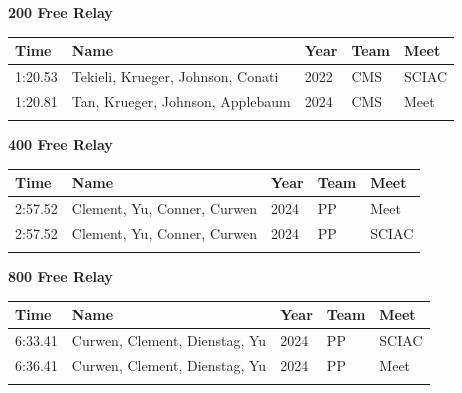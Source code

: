\vspace{1.2em}
\noindent\begin{minipage}[t]{0.98\textwidth}
\centering
\textbf{\textcolor{teamprimary}{200 Free Relay}}\par
\vspace{0.5em}
\centering
\small
\renewcommand{\arraystretch}{1.0}
\setlength{\tabcolsep}{4pt}
\begin{tabular}{@{}p{2.7cm}p{4.3cm}p{1.6cm}p{2.7cm}p{2.7cm}@{}}
\toprule
\textbf{Time} & \textbf{Name} & \textbf{Year} & \textbf{Team} & \textbf{Meet} \\
\midrule
1:20.53 & Tekieli, Krueger, Johnson, Conati & 2022 & CMS & SCIAC \\
1:20.81 & Tan, Krueger, Johnson, Applebaum & 2024 & CMS & Meet \\
\bottomrule
\vspace{0.5em}
\end{tabular}
\end{minipage}
\vspace{1.2em}
\noindent\begin{minipage}[t]{0.98\textwidth}
\centering
\textbf{\textcolor{teamprimary}{400 Free Relay}}\par
\vspace{0.5em}
\centering
\small
\renewcommand{\arraystretch}{1.0}
\setlength{\tabcolsep}{4pt}
\begin{tabular}{@{}p{2.7cm}p{4.3cm}p{1.6cm}p{2.7cm}p{2.7cm}@{}}
\toprule
\textbf{Time} & \textbf{Name} & \textbf{Year} & \textbf{Team} & \textbf{Meet} \\
\midrule
2:57.52 & Clement, Yu, Conner, Curwen & 2024 & PP & Meet \\
2:57.52 & Clement, Yu, Conner, Curwen & 2024 & PP & SCIAC \\
\bottomrule
\vspace{0.5em}
\end{tabular}
\end{minipage}
\vspace{1.2em}
\noindent\begin{minipage}[t]{0.98\textwidth}
\centering
\textbf{\textcolor{teamprimary}{800 Free Relay}}\par
\vspace{0.5em}
\centering
\small
\renewcommand{\arraystretch}{1.0}
\setlength{\tabcolsep}{4pt}
\begin{tabular}{@{}p{2.7cm}p{4.3cm}p{1.6cm}p{2.7cm}p{2.7cm}@{}}
\toprule
\textbf{Time} & \textbf{Name} & \textbf{Year} & \textbf{Team} & \textbf{Meet} \\
\midrule
6:33.41 & Curwen, Clement, Dienstag, Yu & 2024 & PP & SCIAC \\
6:36.41 & Curwen, Clement, Dienstag, Yu & 2024 & PP & Meet \\
\bottomrule
\vspace{0.5em}
\end{tabular}
\end{minipage}
